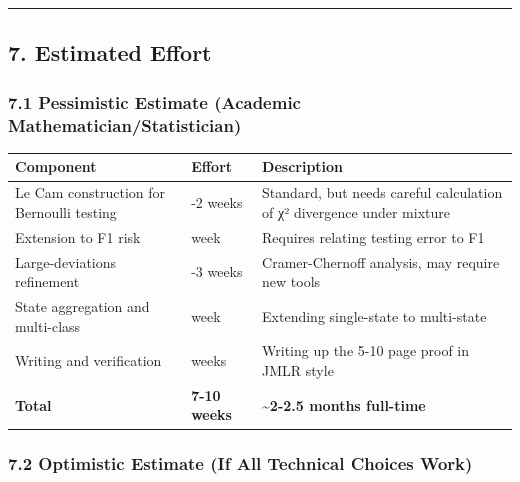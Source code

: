 \documentclass[
  12pt,
]{article}
\begin{document}
\begin{center}\rule{0.5\linewidth}{0.5pt}\end{center}

\subsection{7. Estimated Effort}\label{estimated-effort}

\subsubsection{7.1 Pessimistic Estimate (Academic
Mathematician/Statistician)}\label{pessimistic-estimate-academic-mathematicianstatistician}

\begin{longtable}[]{@{}
  >{\raggedright\arraybackslash}p{}
  >{\raggedright\arraybackslash}p{}
  >{\raggedright\arraybackslash}p{}@{}}
\toprule\noalign{}
\begin{minipage}[b]{\linewidth}\raggedright
Component
\end{minipage} & \begin{minipage}[b]{\linewidth}\raggedright
Effort
\end{minipage} & \begin{minipage}[b]{\linewidth}\raggedright
Description
\end{minipage} \\
\midrule\noalign{}
\endhead
\bottomrule\noalign{}
\endlastfoot
Le Cam construction for Bernoulli testing & 1-2 weeks & Standard, but
needs careful calculation of χ² divergence under mixture \\
Extension to F1 risk & 1 week & Requires relating testing error to F1 \\
Large-deviations refinement & 2-3 weeks & Cramer-Chernoff analysis, may
require new tools \\
State aggregation and multi-class & 1 week & Extending single-state to
multi-state \\
Writing and verification & 2 weeks & Writing up the 5-10 page proof in
JMLR style \\
\textbf{Total} & \textbf{7-10 weeks} & \textbf{\textasciitilde2-2.5
months full-time} \\
\end{longtable}

\subsubsection{7.2 Optimistic Estimate (If All Technical Choices
Work)}\label{optimistic-estimate-if-all-technical-choices-work}
\end{document}
